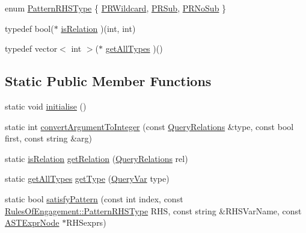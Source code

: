 \begin{DoxyCompactItemize}
enum \hyperlink{class_rules_of_engagement_a97613ded2253a252de010070d7c54ac1}{Pattern\-R\-H\-S\-Type} \{ \hyperlink{class_rules_of_engagement_a97613ded2253a252de010070d7c54ac1ab823799dfda20af778a3848abfc46e84}{P\-R\-Wildcard}, 
\hyperlink{class_rules_of_engagement_a97613ded2253a252de010070d7c54ac1a956642bd04a30d5d37ea95257f79d331}{P\-R\-Sub}, 
\hyperlink{class_rules_of_engagement_a97613ded2253a252de010070d7c54ac1a106d4eaf9b0bc4cefdee0e20e244e06a}{P\-R\-No\-Sub}
 \}
\item 
typedef bool($\ast$ \hyperlink{class_rules_of_engagement_aad838c0ef69d7c4ee9bef23a431ff6c1}{is\-Relation} )(int, int)
\item 
typedef vector$<$ int $>$($\ast$ \hyperlink{class_rules_of_engagement_a1a051f48865a7a4d7f07f0a89f16aafe}{get\-All\-Types} )()
\end{DoxyCompactItemize}
\subsection*{Static Public Member Functions}
\begin{DoxyCompactItemize}
\item 
static void \hyperlink{class_rules_of_engagement_a4ffc088479ffe671fdcc3ff658faa973}{initialise} ()
\item 
static int \hyperlink{class_rules_of_engagement_af0e6596cfee9a230105c42e6d9ee5cca}{convert\-Argument\-To\-Integer} (const \hyperlink{class_rules_of_engagement_a5e08db2a0638b98dbb06ad923a33d817}{Query\-Relations} \&type, const bool first, const string \&arg)
\item 
static \hyperlink{class_rules_of_engagement_aad838c0ef69d7c4ee9bef23a431ff6c1}{is\-Relation} \hyperlink{class_rules_of_engagement_a18a80f1ce5bcf4c10fa520a0785c0922}{get\-Relation} (\hyperlink{class_rules_of_engagement_a5e08db2a0638b98dbb06ad923a33d817}{Query\-Relations} rel)
\item 
static \hyperlink{class_rules_of_engagement_a1a051f48865a7a4d7f07f0a89f16aafe}{get\-All\-Types} \hyperlink{class_rules_of_engagement_a2b4845903e7378ebf4955714da0d36bf}{get\-Type} (\hyperlink{class_rules_of_engagement_a5dd2b28fd0c906d9b08e29e371713ead}{Query\-Var} type)
\item 
static bool \hyperlink{class_rules_of_engagement_a6d82299f9e291ea53856f9eeff143451}{satisfy\-Pattern} (const int index, const \hyperlink{class_rules_of_engagement_a97613ded2253a252de010070d7c54ac1}{Rules\-Of\-Engagement\-::\-Pattern\-R\-H\-S\-Type} R\-H\-S, const string \&R\-H\-S\-Var\-Name, const \hyperlink{class_a_s_t_expr_node}{A\-S\-T\-Expr\-Node} $\ast$R\-H\-Sexprs)
\end{DoxyCompactItemize}
